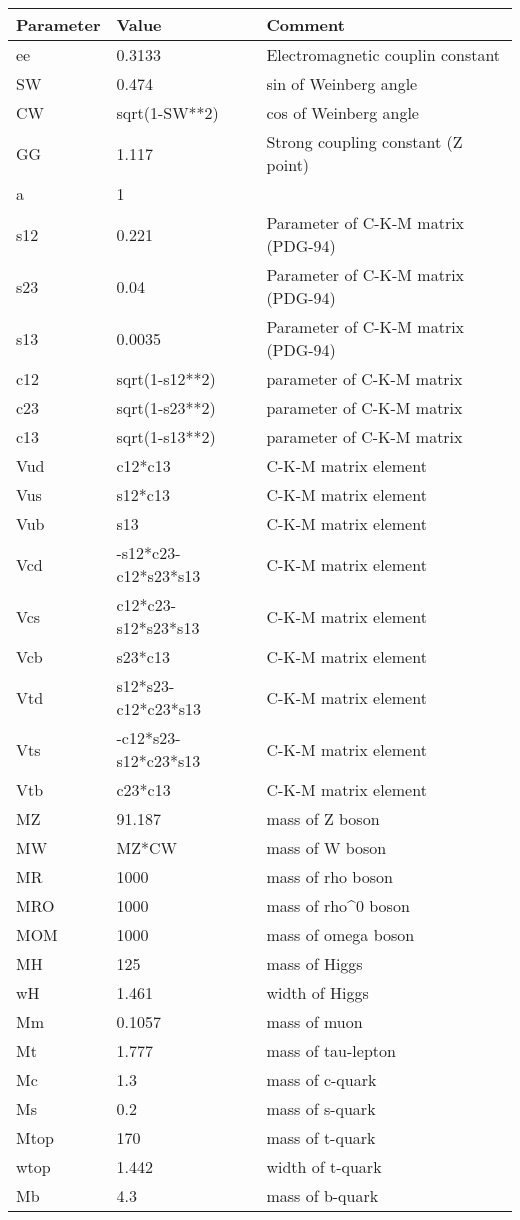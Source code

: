 \begin{tabular}{|l|l|l|} \hline
Parameter & Value & Comment \\ \hline
ee    &0.3133              &Electromagnetic couplin constant \\
SW    &0.474               &sin of Weinberg angle \\
CW    &sqrt(1-SW**2)       &cos of Weinberg angle \\
GG    &1.117               &Strong coupling constant (Z point) \\
a     &1                   & \\
s12   &0.221               &Parameter of C-K-M matrix (PDG-94) \\
s23   &0.04                &Parameter of C-K-M matrix (PDG-94) \\
s13   &0.0035              &Parameter of C-K-M matrix (PDG-94) \\
c12   &sqrt(1-s12**2)      &parameter  of C-K-M matrix \\
c23   &sqrt(1-s23**2)      &parameter  of C-K-M matrix \\
c13   &sqrt(1-s13**2)      &parameter  of C-K-M matrix \\
Vud   &c12*c13             &C-K-M matrix element \\
Vus   &s12*c13             &C-K-M matrix element \\
Vub   &s13                 &C-K-M matrix element \\
Vcd   &-s12*c23-c12*s23*s13&C-K-M matrix element \\
Vcs   &c12*c23-s12*s23*s13 &C-K-M matrix element \\
Vcb   &s23*c13             &C-K-M matrix element \\
Vtd   &s12*s23-c12*c23*s13 &C-K-M matrix element \\
Vts   &-c12*s23-s12*c23*s13&C-K-M matrix element \\
Vtb   &c23*c13             &C-K-M matrix element \\
MZ    &91.187              &mass of Z boson \\
MW    &MZ*CW               &mass of W boson \\
MR    &1000                &mass of rho boson \\
MRO   &1000                &mass of rho^0 boson \\
MOM   &1000                &mass of omega boson \\
MH    &125                 &mass of Higgs \\
wH    &1.461               &width of Higgs \\
Mm    &0.1057              &mass of muon \\
Mt    &1.777               &mass of tau-lepton \\
Mc    &1.3                 &mass of c-quark \\
Ms    &0.2                 &mass of s-quark \\
Mtop  &170                 &mass of t-quark \\
wtop  &1.442               &width of t-quark \\
Mb    &4.3                 &mass of b-quark \\ \hline
\end{tabular}
